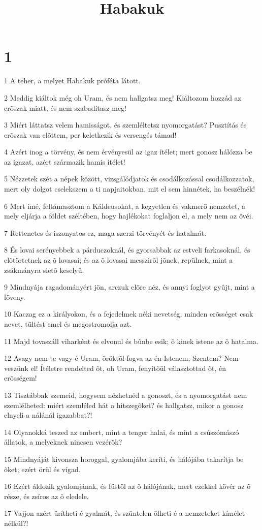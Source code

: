 

\title{Habakuk}


\chapter{1}

\par 1 A teher, a melyet Habakuk próféta látott.
\par 2 Meddig kiáltok még oh Uram, és nem hallgatsz meg! Kiáltozom hozzád az erõszak miatt, és nem szabadítasz meg!
\par 3 Miért láttatsz velem hamisságot, és szemléltetsz nyomorgatást? Pusztítás és erõszak van elõttem, per keletkezik és versengés támad!
\par 4 Azért inog a törvény, és nem érvényesül az igaz ítélet; mert gonosz hálózza be az igazat, azért származik hamis ítélet!
\par 5 Nézzetek szét a népek között, vizsgálódjatok és csodálkozással csodálkozzatok, mert oly dolgot cselekszem a ti napjaitokban, mit el sem hinnétek, ha beszélnék!
\par 6 Mert ímé, feltámasztom a Káldeusokat, a kegyetlen és vakmerõ nemzetet, a mely eljárja a földet széltében, hogy hajlékokat foglaljon el, a mely nem az övéi.
\par 7 Rettenetes és iszonyatos ez, maga szerzi törvényét és hatalmát.
\par 8 És lovai serényebbek a párduczoknál, és gyorsabbak az estveli farkasoknál, és elõtörtetnek az õ lovasai; és az õ lovasai messzirõl jõnek, repülnek, mint a zsákmányra sietõ keselyû.
\par 9 Mindnyája ragadományért jön, arczuk elõre néz, és annyi foglyot gyûjt, mint a föveny.
\par 10 Kaczag ez a királyokon, és a fejedelmek néki nevetség, minden erõsséget csak nevet, tültést emel és megostromolja azt.
\par 11 Majd tovaszáll viharként és elvonul és bûnbe esik; õ kinek istene az õ hatalma.
\par 12 Avagy nem te vagy-é Uram, öröktõl fogva az én Istenem, Szentem? Nem veszünk el! Ítéletre rendelted õt, oh Uram, fenyítõül választottad õt, én erõsségem!
\par 13 Tisztábbak szemeid, hogysem nézhetnéd a gonoszt, és a nyomorgatást nem szemlélheted: miért szemléled hát a hitszegõket? és hallgatsz, mikor a gonosz elnyeli a nálánál igazabbat?!
\par 14 Olyanokká teszed az embert, mint a tenger halai, és mint a csúszómászó állatok, a melyeknek nincsen vezérök?
\par 15 Mindnyáját kivonsza horoggal, gyalomjába keríti, és hálójába takarítja be õket; ezért örül és vígad.
\par 16 Ezért áldozik gyalomjának, és füstöl az õ hálójának, mert ezekkel kövér az õ része, és zsíros az õ eledele.
\par 17 Vajjon azért ürítheti-é gyalmát, és szüntelen ölheti-é a nemzeteket kímélet nélkül?!

